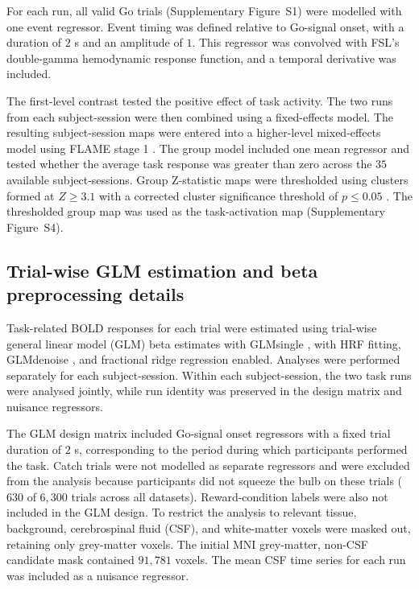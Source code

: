 \documentclass[utf8]{frontiers_suppmat}
\begin{document}
For each run, all valid Go trials (Supplementary Figure~S1) were modelled with one event regressor. Event timing was defined relative to Go-signal onset, with a duration of $2$ s and an amplitude of $1$. This regressor was convolved with FSL’s double-gamma hemodynamic response function, and a temporal derivative was included.

The first-level contrast tested the positive effect of task activity. The two runs from each subject-session were then combined using a fixed-effects model. The resulting subject-session maps were entered into a higher-level mixed-effects model using FLAME stage 1 \citep{woolrich2004multilevel, beckmann2003general}. The group model included one mean regressor and tested whether the average task response was greater than zero across the $35$ available subject-sessions. Group Z-statistic maps were thresholded using clusters formed at $Z \geq 3.1$ with a corrected cluster significance threshold of $p \leq 0.05$ \citep{worsley200114}. The thresholded group map was used as the task-activation map (Supplementary Figure~S4).

\subsection{Trial-wise GLM estimation and beta preprocessing details}
Task-related BOLD responses for each trial were estimated using trial-wise general linear model (GLM) beta estimates with GLMsingle \citep{prince2022improving}, with HRF fitting, GLMdenoise \citep{kay2013glmdenoise}, and fractional ridge regression enabled. Analyses were performed separately for each subject-session. Within each subject-session, the two task runs were analysed jointly, while run identity was preserved in the design matrix and nuisance regressors.

The GLM design matrix included Go-signal onset regressors with a fixed trial duration of $2$ s, corresponding to the period during which participants performed the task. Catch trials were not modelled as separate regressors and were excluded from the analysis because participants did not squeeze the bulb on these trials ($630$ of $6{,}300$ trials across all datasets). Reward-condition labels were also not included in the GLM design. To restrict the analysis to relevant tissue, background, cerebrospinal fluid (CSF), and white-matter voxels were masked out, retaining only grey-matter voxels. The initial MNI grey-matter, non-CSF candidate mask contained $91{,}781$ voxels. The mean CSF time series for each run was included as a nuisance regressor.
\end{document}
